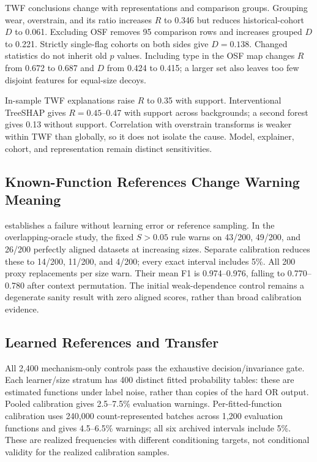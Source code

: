 \documentclass[conference]{IEEEtran}
\begin{document}
TWF conclusions change with representations and comparison groups. Grouping wear, overstrain, and its ratio increases $R$ to 0.346 but reduces historical-cohort $D$ to 0.061. Excluding OSF removes 95 comparison rows and increases grouped $D$ to 0.221. Strictly single-flag cohorts on both sides give $D=0.138$. Changed statistics do not inherit old $p$ values. Including type in the OSF map changes $R$ from 0.672 to 0.687 and $D$ from 0.424 to 0.415; a larger set also leaves too few disjoint features for equal-size decoys.

In-sample TWF explanations raise $R$ to 0.35 with support. Interventional TreeSHAP gives $R=0.45$--0.47 with support across backgrounds; a second forest gives 0.13 without support. Correlation with overstrain transforms is weaker within TWF than globally, so it does not isolate the cause. Model, explainer, cohort, and representation remain distinct sensitivities.

\subsection{Known-Function References Change Warning Meaning}
 establishes a failure without learning error or reference sampling. In the overlapping-oracle study, the fixed $S>0.05$ rule warns on 43/200, 49/200, and 26/200 perfectly aligned datasets at increasing sizes. Separate calibration reduces these to 14/200, 11/200, and 4/200; every exact interval includes 5\%. All 200 proxy replacements per size warn. Their mean F1 is 0.974--0.976, falling to 0.770--0.780 after context permutation. The initial weak-dependence control remains a degenerate sanity result with zero aligned scores, rather than broad calibration evidence.

\subsection{Learned References and Transfer}
All 2{,}400 mechanism-only controls pass the exhaustive decision/invariance gate. Each learner/size stratum has 400 distinct fitted probability tables: these are estimated functions under label noise, rather than copies of the hard OR output. Pooled calibration gives 2.5--7.5\% evaluation warnings. Per-fitted-function calibration uses 240{,}000 count-represented batches across 1{,}200 evaluation functions and gives 4.5--6.5\% warnings; all six archived intervals include 5\%. These are realized frequencies with different conditioning targets, not conditional validity for the realized calibration samples.
\end{document}

